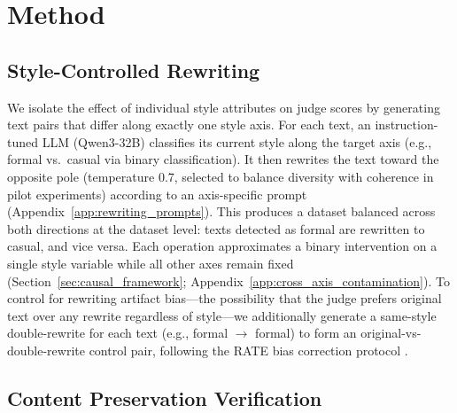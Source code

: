 \section{Method}
\label{sec:method}

\subsection{Style-Controlled Rewriting}
\label{sec:rewriting}

We isolate the effect of individual style attributes on judge scores by generating text pairs that differ along exactly one style axis.
For each text, an instruction-tuned LLM (Qwen3-32B) classifies its current style along the target axis (e.g., formal vs.\ casual via binary classification).
It then rewrites the text toward the opposite pole (temperature 0.7, selected to balance diversity with coherence in pilot experiments) according to an axis-specific prompt (Appendix~\ref{app:rewriting_prompts}).
This produces a dataset balanced across both directions at the dataset level: texts detected as formal are rewritten to casual, and vice versa.
Each operation approximates a binary intervention on a single style variable while all other axes remain fixed (Section~\ref{sec:causal_framework}; Appendix~\ref{app:cross_axis_contamination}).
To control for rewriting artifact bias---the possibility that the judge prefers original text over any rewrite regardless of style---we additionally generate a same-style double-rewrite for each text (e.g., formal $\to$ formal) to form an original-vs-double-rewrite control pair, following the RATE bias correction protocol \citep{reber2025rate}.

\subsection{Content Preservation Verification}
\label{sec:nli_gate}

